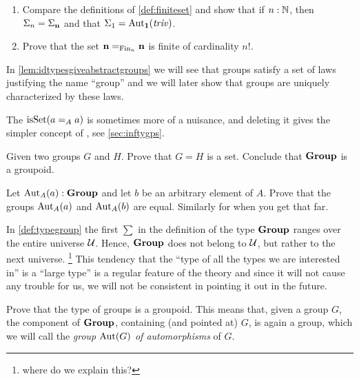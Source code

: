 \begin{xca}
  \begin{enumerate}
  \item Compare the definitions of \cref{def:finiteset} and show that if $n:\mathbb{N}$, then $\Sigma_n=\Sigma_{\mathbf{n} }$ %
and that $\Sigma_{1}=\mathrm{Aut}_{\mathbf{1} }(\mathop{\mathit{triv}})$.
\item Prove that the set $\mathbf{n} =_{\mathrm{Fin}_n}\mathbf{n} $ is finite of cardinality $n!$.
  \end{enumerate} 
\end{xca}

\begin{remark}
In \cref{lem:idtypesgiveabstractgroups} we will see that groups satisfy a set of laws justifying the name ``group''
and we will later show that groups are uniquely characterized by these laws.
\end{remark}
\begin{remark}
  The $\mathrm{isSet}(a=_Aa)$ is sometimes more of a nuisance, and deleting it gives the simpler concept of \aninftygp, see \cref{sec:inftygps}.
\end{remark}
\begin{xca}
  Given two groups $G$ and $H$.  Prove that $G=H$ is a set.  Conclude that $\mathbf{Group}$ is a groupoid.  
\end{xca}
\begin{xca}
   Let $\mathrm{Aut}_A(a):\mathbf{Group}$ and let $b$ be an arbitrary element of $A$.  Prove that the groups $\mathrm{Aut}_A(a)$ and $\mathrm{Aut}_A(b)$ are equal.  Similarly for \inftygps when you get that far.
\end{xca}
\begin{remark}\label{rem:monoidandabsgplarge}
 In \cref{def:typegroup} the first $\sum$ in the definition of the type $\mathbf{Group}$ ranges over the entire universe $\mathcal{U}$.  Hence, $\mathbf{Group}$ does not belong to $\mathcal{U}$, but rather to the next universe. \footnote{where do we explain this?}  This tendency that the ``type of all the types we are interested in'' is a ``large type'' is a regular feature of the theory and since it will not cause any trouble for us, we will not be consistent in pointing it out in the future.
  \end{remark}

  \begin{xca}\label{xca:typegroupisgroupoid}
    Prove that the type of groups is a groupoid.  This means that, given a group $G$, the component of $\mathbf{Group}$, containing (and pointed at) $G$, is again a group, which we will call the \emph{group $\mathrm{Aut}(G)$ of automorphisms} of $G$.
  \end{xca}

